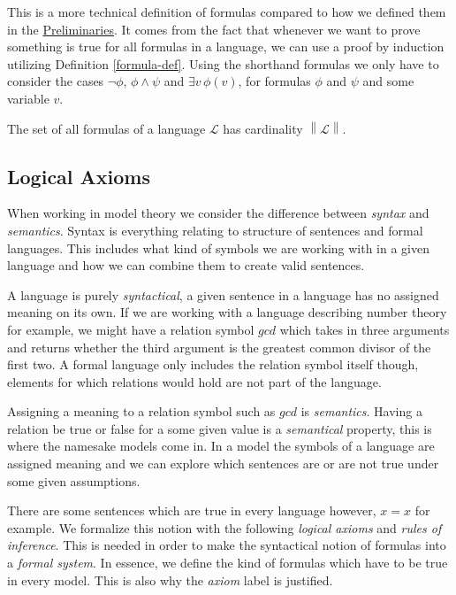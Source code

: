 \documentclass[../../main.tex]{subfiles}
\begin{document}
This is a more technical definition of formulas compared to how we defined them in the \hyperref[preliminaries]{Preliminaries}.
It comes from the fact that whenever we want to prove something is true for all formulas in a language, 
we can use a proof by induction utilizing Definition \ref{formula-def}.
Using the shorthand formulas we only have to consider the cases $\lnot \phi$, $\phi \wedge \psi$ and $\exists v\, \phi(v)$,
for formulas $\phi$ and $\psi$ and some variable $v$.

\begin{proposition}\label{language-cardinality}\cite[Proposition 1.3.4.]{Cha90}
    The set of all formulas of a language $\mathcal{L}$ has cardinality $\left\lVert\mathcal{L}\right\rVert$.
\end{proposition}

\subsection{Logical Axioms}

When working in model theory we consider the difference between \textit{syntax} and \textit{semantics}.
Syntax is everything relating to structure of sentences and formal languages.
This includes what kind of symbols we are working with in a given language and how we can combine them to create valid sentences.

A language is purely \textit{syntactical}, a given sentence in a language has no assigned meaning on its own.
If we are working with a language describing number theory for example, 
we might have a relation symbol $gcd$ which takes in three arguments and returns whether the third argument is the greatest common divisor of the first two.
A formal language only includes the relation symbol itself though, elements for which relations would hold are not part of the language.

Assigning a meaning to a relation symbol such as $gcd$ is \textit{semantics}.
Having a relation be true or false for a some given value is a \textit{semantical} property, this is where the namesake models come in.
In a model the symbols of a language are assigned meaning and we can explore which sentences are or are not true under some given assumptions.\cite[p.3]{Cha90}

There are some sentences which are true in every language however, $x = x$ for example.
We formalize this notion with the following \textit{logical axioms} and \textit{rules of inference}.
This is needed in order to make the syntactical notion of formulas into a \textit{formal system}.
In essence, we define the kind of formulas which have to be true in every model.
This is also why the \textit{axiom} label is justified.
\end{document}
